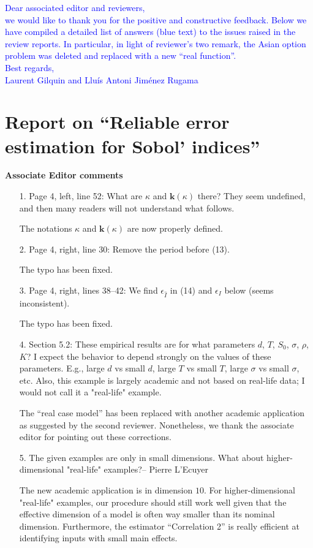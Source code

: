 \documentclass[10pt,a4paper]{article}
\newcommand{\vect}[1]{\boldsymbol{\mathbf{#1}}}
\newcommand{\vk}{\vect{k}}
\begin{document}
\textcolor{blue}{Dear associated editor and reviewers,\\
we would like to thank you for the positive and constructive feedback. Below we have
compiled a detailed list of answers (blue text) to the issues raised in the review reports. In particular, in light of reviewer's two remark, the Asian option problem was deleted and replaced with a new ``real function''.\\
Best regards,\\
Laurent Gilquin and Llu\'{i}s Antoni Jim\'{e}nez Rugama}

\section*{Report on ``Reliable error estimation for Sobol' indices''}

\textbf{\large{Associate Editor comments}}
\vspace*{0.5cm}

\begin{itemize}
\item[1.] Page 4, left, line 52: What are $\kappa$ and $\vk(\kappa)$ there? They seem undefined, and then many readers will not understand what follows.

{\color{blue} The notations $\kappa$ and $\vk(\kappa)$ are now properly defined.}
\item[2.] Page 4, right, line 30: Remove the period before (13).

{\color{blue} The typo has been fixed.}
\item[3.] Page 4, right, lines 38--42: We find $\epsilon_{\hat I}$ in (14) and $\epsilon_{I}$ below (seems inconsistent).

{\color{blue} The typo has been fixed.}
\item[4.] Section 5.2: These empirical results are for what parameters $d$, $T$, $S_0$, $\sigma$, $\rho$, $K$? I expect the behavior to depend strongly on the values of these parameters. E.g., large $d$ vs small $d$, large $T$ vs small $T$, large $\sigma$ vs small $\sigma$, etc. Also, this example is largely academic and not based on real-life data; I would not call it a "real-life" example. 

{\color{blue} The ``real case model'' has been replaced with another academic application as suggested by the second reviewer. Nonetheless, we thank the associate editor for pointing out these corrections.}
\item[5.] The given examples are only in small dimensions. What about higher-dimensional "real-life" examples?-- Pierre L'Ecuyer

{\color{blue} The new academic application is in dimension $10$. For higher-dimensional "real-life" examples, our procedure should still work well given that the effective dimension of a model is often way smaller than its nominal dimension. Furthermore, the estimator ``Correlation 2'' is really efficient at identifying inputs with small main effects.}
\end{itemize}
\end{document}
